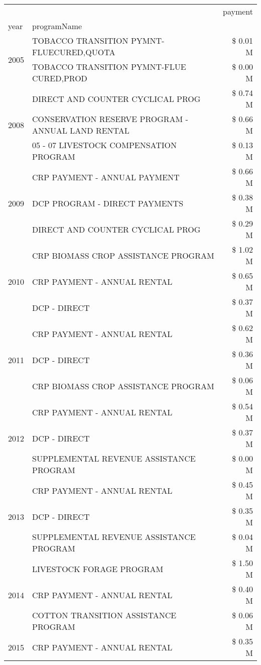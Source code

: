 \begin{tabular}{llr}
\toprule
 &  & payment \\
year & programName &  \\
\midrule
\multirow[t]{2}{*}{2005} & TOBACCO TRANSITION PYMNT-FLUECURED,QUOTA & \$ 0.01 M \\
 & TOBACCO TRANSITION PYMNT-FLUE CURED,PROD & \$ 0.00 M \\
\cline{1-3}
\multirow[t]{3}{*}{2008} & DIRECT AND COUNTER CYCLICAL PROG & \$ 0.74 M \\
 & CONSERVATION RESERVE PROGRAM - ANNUAL LAND RENTAL & \$ 0.66 M \\
 & 05 - 07 LIVESTOCK COMPENSATION PROGRAM & \$ 0.13 M \\
\cline{1-3}
\multirow[t]{3}{*}{2009} & CRP PAYMENT - ANNUAL PAYMENT & \$ 0.66 M \\
 & DCP PROGRAM - DIRECT PAYMENTS & \$ 0.38 M \\
 & DIRECT AND COUNTER CYCLICAL PROG & \$ 0.29 M \\
\cline{1-3}
\multirow[t]{3}{*}{2010} & CRP BIOMASS CROP ASSISTANCE PROGRAM & \$ 1.02 M \\
 & CRP PAYMENT - ANNUAL RENTAL & \$ 0.65 M \\
 & DCP - DIRECT & \$ 0.37 M \\
\cline{1-3}
\multirow[t]{3}{*}{2011} & CRP PAYMENT - ANNUAL RENTAL & \$ 0.62 M \\
 & DCP - DIRECT & \$ 0.36 M \\
 & CRP BIOMASS CROP ASSISTANCE PROGRAM & \$ 0.06 M \\
\cline{1-3}
\multirow[t]{3}{*}{2012} & CRP PAYMENT - ANNUAL RENTAL & \$ 0.54 M \\
 & DCP - DIRECT & \$ 0.37 M \\
 & SUPPLEMENTAL REVENUE ASSISTANCE PROGRAM & \$ 0.00 M \\
\cline{1-3}
\multirow[t]{3}{*}{2013} & CRP PAYMENT - ANNUAL RENTAL & \$ 0.45 M \\
 & DCP - DIRECT & \$ 0.35 M \\
 & SUPPLEMENTAL REVENUE ASSISTANCE PROGRAM & \$ 0.04 M \\
\cline{1-3}
\multirow[t]{3}{*}{2014} & LIVESTOCK FORAGE PROGRAM & \$ 1.50 M \\
 & CRP PAYMENT - ANNUAL RENTAL & \$ 0.40 M \\
 & COTTON TRANSITION ASSISTANCE PROGRAM & \$ 0.06 M \\
\cline{1-3}
\multirow[t]{3}{*}{2015} & CRP PAYMENT - ANNUAL RENTAL & \$ 0.35 M \\

\end{tabular}
